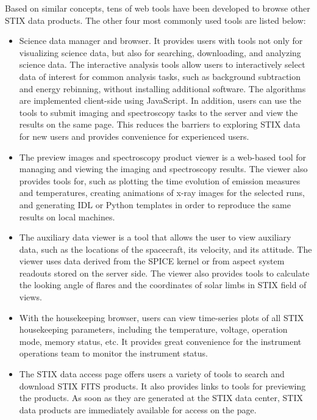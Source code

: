 \documentclass[referee]{aa} %
\begin{document}
Based on similar concepts, tens of web tools have been developed to browse other STIX data products.
The other four most commonly used tools are listed below: 
\begin{itemize}
  \item  Science data manager and browser.  It provides users with tools not only for visualizing science data, but also for searching, downloading, and analyzing science data. The interactive analysis tools allow users to interactively select data of interest for common analysis tasks, such as background subtraction and energy rebinning,  without installing additional software. 
  The algorithms are implemented client-side using JavaScript. 
 In addition, users can use the tools to submit imaging and spectroscopy tasks to the server and view the results on the same page. This reduces the barriers to exploring STIX data for new users and provides convenience for experienced users.

  \item  The preview images and spectroscopy product viewer is a web-based tool for managing and viewing the imaging and spectroscopy results. The viewer also provides tools for, such as plotting the time evolution of emission measures and temperatures,  creating animations of x-ray images for the selected runs, and generating IDL or Python templates in order to reproduce the same results on  local machines.
  \item The auxiliary data viewer is a tool that allows the user to view auxiliary data, such as the locations of the spacecraft, its velocity, and its attitude. The viewer uses data derived from the SPICE kernel or from aspect system readouts stored on the server side.  The viewer also provides tools to calculate the looking angle of flares and the coordinates of solar limbs in STIX field of views.
  \item  With the housekeeping browser, users can view time-series plots of all STIX housekeeping parameters, including the temperature, voltage, operation mode, memory status, etc. It provides great convenience for the instrument operations team to monitor the instrument status. 
\item 
The STIX data access page offers users a variety of tools to search and download STIX FITS products. 
It also provides links to tools for previewing the products. As soon as they are generated at the STIX data center, STIX data products are immediately available for access on the page.
\end{itemize}
\end{document}
